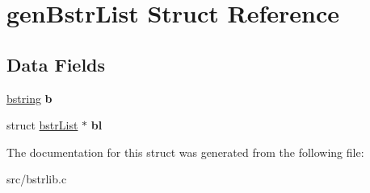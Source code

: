 \hypertarget{structgenBstrList}{}\section{gen\+Bstr\+List Struct Reference}
\label{structgenBstrList}
\subsection*{Data Fields}
\begin{DoxyCompactItemize}
\item 
\hypertarget{structgenBstrList_afbc60fff27346f61f706e48aa9143cb2}{}\hyperlink{structtagbstring}{bstring} {\bfseries b}\label{structgenBstrList_afbc60fff27346f61f706e48aa9143cb2}

\item 
\hypertarget{structgenBstrList_abf9382d773a085b9015807e24ac8fbda}{}struct \hyperlink{structbstrList}{bstr\+List} $\ast$ {\bfseries bl}\label{structgenBstrList_abf9382d773a085b9015807e24ac8fbda}

\end{DoxyCompactItemize}


The documentation for this struct was generated from the following file\+:\begin{DoxyCompactItemize}
\item 
src/bstrlib.\+c\end{DoxyCompactItemize}
